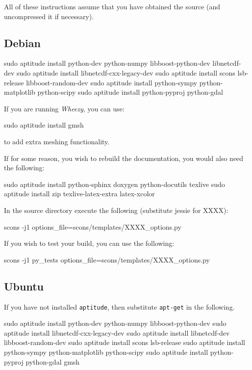 All of these instructions assume that you have obtained the \escript source (and uncompressed it if necessary).
\subsection{Debian}\label{sec:debsrc}

\begin{shellCode}
sudo aptitude install python-dev python-numpy libboost-python-dev libnetcdf-dev 
sudo aptitude install libnetcdf-cxx-legacy-dev
sudo aptitude install scons lsb-release libboost-random-dev
sudo aptitude install python-sympy python-matplotlib python-scipy
sudo aptitude install python-pyproj python-gdal 
\end{shellCode}

\noindent If you are running \textit{Wheezy}, you can use:
\begin{shellCode}
sudo aptitude install gmsh 
\end{shellCode}
to add extra meshing functionality.

\begin{optionalstep}
If for some reason, you wish to rebuild the documentation, you would also need the following:
\begin{shellCode}
sudo aptitude install python-sphinx doxygen python-docutils texlive 
sudo aptitude install zip texlive-latex-extra latex-xcolor 
\end{shellCode}
\end{optionalstep}

\noindent In the source directory execute the following (substitute jessie for XXXX):
\begin{shellCode}
scons -j1 options_file=scons/templates/XXXX_options.py
\end{shellCode}

\noindent If you wish to test your build, you can use the following:
\begin{shellCode}
scons -j1 py_tests options_file=scons/templates/XXXX_options.py 
\end{shellCode}

\subsection{Ubuntu}\label{sec:ubsrc}

If you have not installed \texttt{aptitude}, then substitute \texttt{apt-get} in the following.
\begin{shellCode}
sudo aptitude install python-dev python-numpy libboost-python-dev 
sudo aptitude install libnetcdf-cxx-legacy-dev
sudo aptitude install libnetcdf-dev libboost-random-dev
sudo aptitude install scons lsb-release
sudo aptitude install python-sympy python-matplotlib python-scipy
sudo aptitude install python-pyproj python-gdal gmsh
\end{shellCode}


